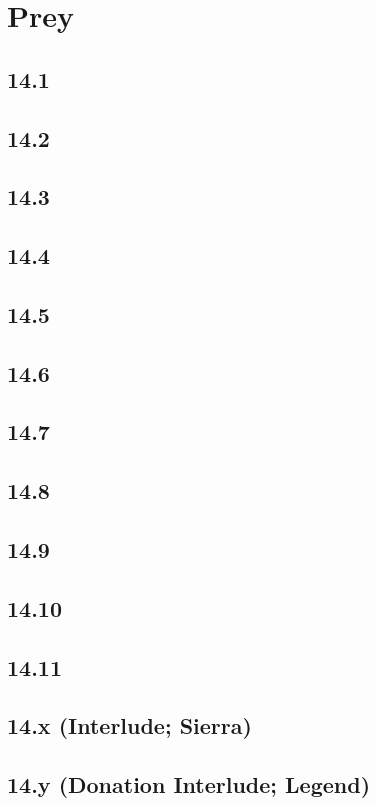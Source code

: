 \part{Prey}
 \chapter{14.1}
 \chapter{14.2}
 \chapter{14.3}
 \chapter{14.4}
 \chapter{14.5}
 \chapter{14.6}
 \chapter{14.7}
 \chapter{14.8}
 \chapter{14.9}
 \chapter{14.10}
 \chapter{14.11}
 \chapter{14.x (Interlude; Sierra)}
 \chapter{14.y (Donation Interlude; Legend)}














